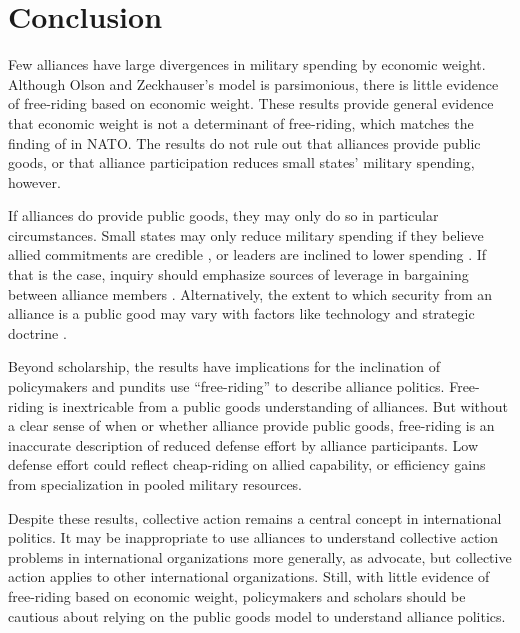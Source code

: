 \documentclass[12pt]{article}
\begin{document}
\section{Conclusion}

Few alliances have large divergences in military spending by economic weight. 
Although Olson and Zeckhauser's model is parsimonious, there is little evidence of free-riding based on economic weight. 
These results provide general evidence that economic weight is not a determinant of free-riding, which matches the finding of \citet{PluemperNeumayer2015} in NATO. 
The results do not rule out that alliances provide public goods, or that alliance participation reduces small states' military spending, however. 


If alliances do provide public goods, they may only do so in particular circumstances. 
Small states may only reduce military spending if they believe allied commitments are credible \citep{Goldstein1995, DigiuseppePoast2016}, or leaders are inclined to lower spending \citep{Fuhrmann2020}. 
If that is the case, inquiry should emphasize sources of leverage in bargaining between alliance members \citep{Morrow1991, Norrlof2010, Brooksetal2013, Johnson2015, Kim2016}. 
Alternatively, the extent to which security from an alliance is a public good may vary with factors like technology and strategic doctrine \citep{SandlerHartley2001}. 


Beyond scholarship, the results have implications for the inclination of policymakers and pundits use ``free-riding'' to describe alliance politics. 
Free-riding is inextricable from a public goods understanding of alliances.
But without a clear sense of when or whether alliance provide public goods, free-riding is an inaccurate description of reduced defense effort by alliance participants.  
Low defense effort could reflect cheap-riding on allied capability, or efficiency gains from specialization in pooled military resources. 


Despite these results, collective action remains a central concept in international politics.   
It may be inappropriate to use alliances to understand collective action problems in international organizations more generally, as \citet[pg. 266-7]{OlsonZeckhauser1966} advocate, but collective action applies to other international organizations. 
Still, with little evidence of free-riding based on economic weight, policymakers and scholars should be cautious about relying on the public goods model to understand alliance politics.  



\singlespace


 
\end{document}
